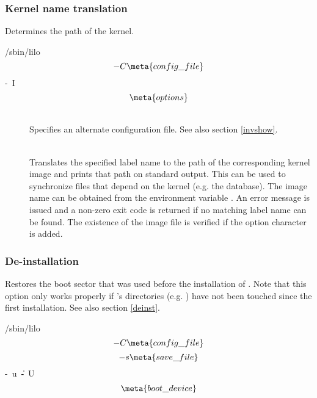 \subsubsection{Kernel name translation}

Determines the path of the kernel.

\begin{command}
  /sbin/lilo
    \unit{\[ -C \meta{config\_file} \]}
    \unit{-I }
    \unit{\[ \meta{options} \]}
\end{command}

\begin{description}
  \item[]~\\
    Specifies an alternate configuration file. See also section \ref{invshow}.
  \item[]~ \\
    Translates the specified label name to the path of the corresponding kernel
    image and prints that path on standard output. This can be used to
    synchronize
    files that depend on the kernel (e.g. the  database). The image
    name can be obtained from the environment variable . An
    error message is issued and a non-zero exit code is returned if no
    matching label name can be found. The existence of the image file is
    verified if the option character  is added.
\end{description}


\subsubsection{De-installation}

Restores the boot sector that was used before the installation of \LILO.
Note that this option only works properly if \LILO's directories (e.g.
) have not been touched since the first installation. See also
section \ref{deinst}.

\begin{command}
  /sbin/lilo
    \unit{\[ -C \meta{config\_file} \]}
    \unit{\[ -s \meta{save\_file} \]}
    \unit{-u \| -U}
    \unit{\[ \meta{boot\_device} \]}
\end{command}

